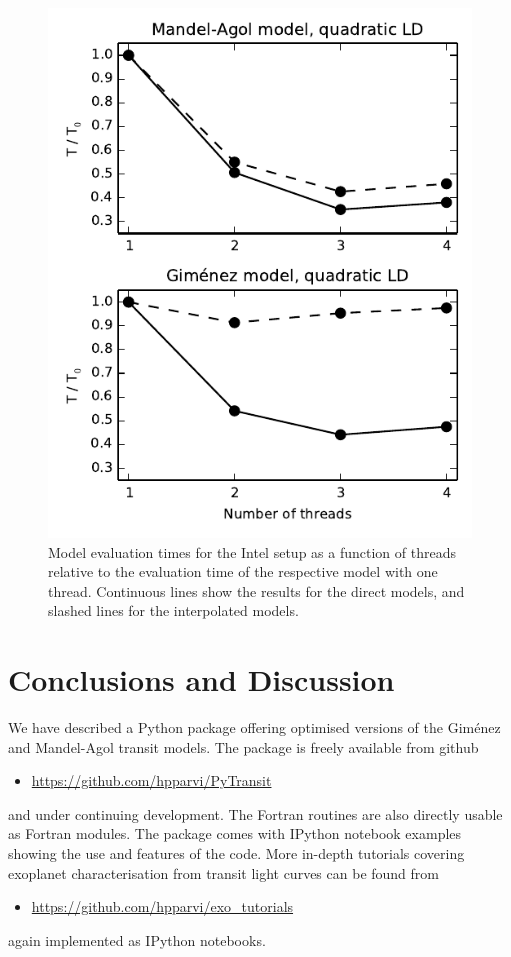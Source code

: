 \documentclass[usenatbib,usegraphicx,useAMS]{mn2e}
\newcommand{\gimenez}{Gim\'enez\xspace}
\begin{document}
{\begin{figure}
 \centering
 \includegraphics[width=\columnwidth]{threading.pdf}
 \caption{Model evaluation times for the Intel setup as a function of threads relative to the evaluation time of 
the respective model with one thread. Continuous lines show the results for the direct models, and slashed lines for 
the interpolated models.} \label{fig:threading}
\end{figure}

\section{Conclusions and Discussion}
\label{sec:conclusions}
We have described a Python package offering optimised versions of the \gimenez and Mandel-Agol transit models. The 
package is freely available from github
\begin{itemize}
 \item[] \url{https://github.com/hpparvi/PyTransit}
\end{itemize}
and under continuing development. The Fortran routines are also directly usable as Fortran modules. The
package comes with IPython notebook examples showing the use and features of the code. More in-depth tutorials
covering exoplanet characterisation from transit light curves can be found from
\begin{itemize}
 \item[] \url{https://github.com/hpparvi/exo_tutorials}
\end{itemize}
again implemented as IPython notebooks.

}
\end{document}
